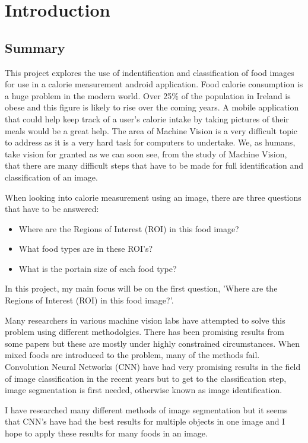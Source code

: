 \chapter{Introduction}
\label{intro}

\section{Summary}
This project explores the use of indentification and classification of food images for use in a calorie measurement android application.
Food calorie consumption is a huge problem in the modern world.
Over 25\% of the population in Ireland is obese and this figure is likely to rise over the coming years.
A mobile application that could help keep track of a user's calorie intake by taking pictures of their meals would be a great help.
The area of Machine Vision is a very difficult topic to address as it is a very hard task for computers to undertake.
We, as humans, take vision for granted as we can soon see, from the study of Machine Vision, that there are many difficult steps that have to be made for full identification and classification of an image.

When looking into calorie measurement using an image, there are three questions that have to be answered:
\begin{itemize}
\item{Where are the Regions of Interest (ROI) in this food image?}
\item{What food types are in these ROI's?}
\item{What is the portain size of each food type?}
\end{itemize}
In this project, my main focus will be on the first question, 'Where are the Regions of Interest (ROI) in this food image?'.

Many researchers in various machine vision labs have attempted to solve this problem using different methodolgies.
There has been promising results from some papers but these are mostly under highly constrained circumstances.
When mixed foods are introduced to the problem, many of the methods fail.
Convolution Neural Networks (CNN) have had very promising results in the field of image classification in the recent years but to get to the classification step, image segmentation is first needed, otherwise known as image identification.

I have researched many different methods of image segmentation but it seems that CNN's have had the best results for multiple objects in one image and I hope to apply these results for many foods in an image.

